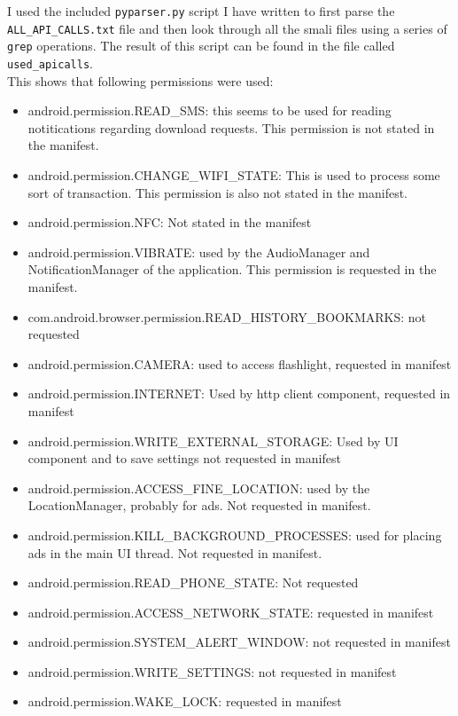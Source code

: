 \documentclass[10pt,a4paper]{article}
\begin{document}
I used the included \texttt{pyparser.py} script I have written to first parse the
\texttt{ALL\_API\_CALLS.txt} file and then look through all the smali files
using a series of \texttt{grep} operations. The result of this script can be
found in the file called \texttt{used\_apicalls}.\\
This shows that following permissions were used:
\begin{itemize}
  \item android.permission.READ\_SMS: this seems to be used for reading
    notitications regarding download requests. This permission is not stated in
    the manifest.
  \item android.permission.CHANGE\_WIFI\_STATE: This is used to process some
    sort of transaction. This permission  is also not
    stated in the manifest.
  \item android.permission.NFC: Not stated in the manifest
  \item android.permission.VIBRATE: used by the AudioManager and
    NotificationManager of the application. This permission is requested in the
    manifest.
  \item com.android.browser.permission.READ\_HISTORY\_BOOKMARKS: not requested
  \item android.permission.CAMERA: used to access flashlight, requested in
    manifest
  \item android.permission.INTERNET: Used by http client component, requested in
    manifest
  \item android.permission.WRITE\_EXTERNAL\_STORAGE: Used by UI component and to
    save settings not requested in manifest
  \item android.permission.ACCESS\_FINE\_LOCATION: used by the LocationManager,
    probably for ads. Not requested in manifest.
  \item android.permission.KILL\_BACKGROUND\_PROCESSES: used for placing ads in
    the main UI thread. Not requested in manifest.
  \item  android.permission.READ\_PHONE\_STATE: Not requested
  \item android.permission.ACCESS\_NETWORK\_STATE: requested in manifest 
  \item android.permission.SYSTEM\_ALERT\_WINDOW: not requested in manifest 

  \item android.permission.WRITE\_SETTINGS: not requested in manifest 

  \item android.permission.WAKE\_LOCK: requested in manifest 
\end{itemize}
\newpage
\end{document}
